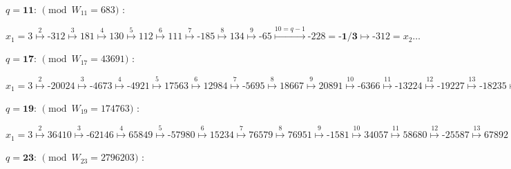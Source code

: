 \documentclass[latin1]{quadrature}
\newcommand{\PMod}[1]{\!\!\pmod{#1}}
\begin{document}
\begin{article}
\begin{article}
\vspace{.1in}

$q=\textbf{11}$: $\PMod{W_{11}=683}$ :

$x_1 = 3
\stackrel{2}{\mapsto} \text{-312}
\stackrel{3}{\mapsto} \text{181}
\stackrel{4}{\mapsto} \text{130}
\stackrel{5}{\mapsto} \text{112}
\stackrel{6}{\mapsto} \text{111}
\stackrel{7}{\mapsto} \text{-185}
\stackrel{8}{\mapsto} \text{134}
\stackrel{9}{\mapsto} \text{-65}
\stackrel{10=q-1}{\mapsto} \text{-228} = \textbf{-1/3}
\stackrel{}{\mapsto} \text{-312}= x_2 \dots $

\vspace{.1in}

$q=\textbf{17}$: $\PMod{W_{17}=43691}$ :

$x_1 = 3
\stackrel{2}{\mapsto} \text{-20024}
\stackrel{3}{\mapsto} \text{-4673}
\stackrel{4}{\mapsto} \text{-4921}
\stackrel{5}{\mapsto} \text{17563}
\stackrel{6}{\mapsto} \text{12984}
\stackrel{7}{\mapsto} \text{-5695}
\stackrel{8}{\mapsto} \text{18667}
\stackrel{9}{\mapsto} \text{20891}
\stackrel{10}{\mapsto} \text{-6366}
\stackrel{11}{\mapsto} \text{-13224}
\stackrel{12}{\mapsto} \text{-19227}
\stackrel{13}{\mapsto} \text{-18235}
\stackrel{14}{\mapsto} \text{-15993}
\stackrel{15}{\mapsto} \text{511}
\stackrel{16=q-1}{\mapsto} \text{-14564} = \textbf{-1/3}
\stackrel{}{\mapsto} \text{-20024} = x_2 \dots $

\vspace{.1in}

$q=\textbf{19}$: $\PMod{W_{19}= 174763}$ :

$x_1 = 3
\stackrel{2}{\mapsto} \text{36410}
\stackrel{3}{\mapsto} \text{-62146}
\stackrel{4}{\mapsto} \text{65849}
\stackrel{5}{\mapsto} \text{-57980}
\stackrel{6}{\mapsto} \text{15234}
\stackrel{7}{\mapsto} \text{76579}
\stackrel{8}{\mapsto} \text{76951}
\stackrel{9}{\mapsto} \text{-1581}
\stackrel{10}{\mapsto} \text{34057}
\stackrel{11}{\mapsto} \text{58680}
\stackrel{12}{\mapsto} \text{-25587}
\stackrel{13}{\mapsto} \text{67892}
\stackrel{14}{\mapsto} \text{66223}
\stackrel{15}{\mapsto} \text{56973}
\stackrel{16}{\mapsto} \text{-77064}
\stackrel{17}{\mapsto} \text{1023}
\stackrel{18=q-1}{\mapsto} \text{58254} = \textbf{-1/3}
\stackrel{}{\mapsto} \text{36410} = x_2 \dots $

\vspace{.1in}

$q=\textbf{23}$: $\PMod{W_{23}= 2796203}$ :


\end{article}
\end{article}
\end{document}
